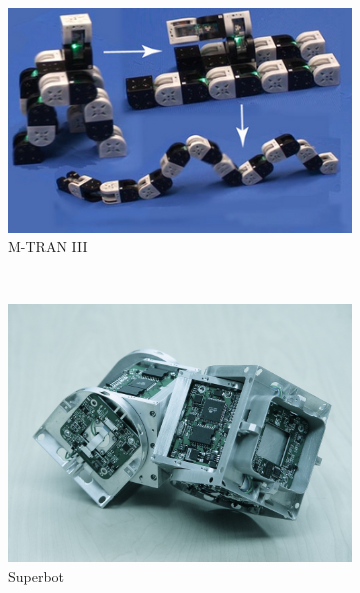\begin{figure}[h]
		\centering
        \begin{subfigure}[b]{0.25\textwidth}
                \centering
                \includegraphics[width=\textwidth]{images/M-TRAN02.jpg}
                \caption{M-TRAN III}
                \label{fig:M-TRAN}
        \end{subfigure}
        ~
        \begin{subfigure}[b]{0.18\textwidth}
                \centering
                \includegraphics[width=\textwidth]{images/Superbot01.JPG}
                \caption{Superbot}
                \label{fig:Superbot}
        \end{subfigure}
        ~
        \begin{subfigure}[b]{0.28\textwidth}
         	   \centering

\end{subfigure}
\end{figure}
